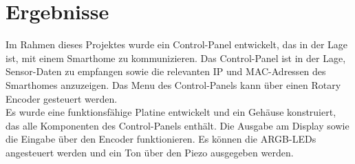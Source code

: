 \chapter{Ergebnisse}
Im Rahmen dieses Projektes wurde ein Control-Panel entwickelt, das in der Lage ist,
mit einem Smarthome zu kommunizieren. Das Control-Panel ist in der Lage,
Sensor-Daten zu empfangen sowie die relevanten IP und MAC-Adressen des Smarthomes
anzuzeigen. Das Menu des Control-Panels kann über einen Rotary Encoder gesteuert
werden.\\

Es wurde eine funktionsfähige Platine entwickelt und ein Gehäuse
konstruiert, das alle Komponenten des Control-Panels enthält. Die Ausgabe am Display
sowie die Eingabe über den Encoder funktionieren. Es können die ARGB-LEDs angesteuert werden
und ein Ton über den Piezo ausgegeben werden. \\~\\


